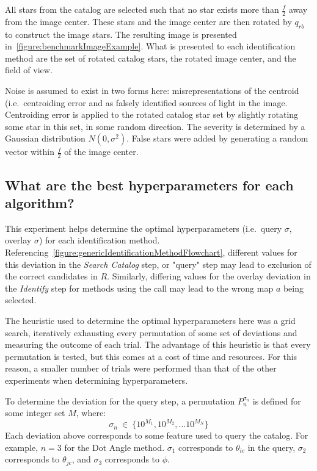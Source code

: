 All stars from the catalog are selected such that no star exists more than $\frac{f}{2}$ away from the image center.
These stars and the image center are then rotated by $q_{rb}$ to construct the image stars.
The resulting image is presented in~\autoref{figure:benchmarkImageExample}.
What is presented to each identification method are the set of rotated catalog stars, the rotated image center, and
the field of view.

Noise is assumed to exist in two forms here: misrepresentations of the centroid (i.e.\ centroiding error and as
falsely identified sources of light in the image.
Centroiding error is applied to the rotated catalog star set by slightly rotating some star in this set, in some
random direction.
The severity is determined by a Gaussian distribution $N(0, \sigma^2)$.
False stars were added by generating a random vector within $\frac{f}{2}$ of the image center.

\subsection{What are the best hyperparameters for each algorithm?}\label{subsec:hyperparameterSelectionMethods}
This experiment helps determine the optimal hyperparameters (i.e.\ query $\sigma$, overlay $\sigma$) for each
identification method.
Referencing~\autoref{figure:genericIdentificationMethodFlowchart}, different values for this deviation in the
\textit{Search Catalog} step, or "query" step may lead to exclusion of the correct candidates in $R$.
Similarly, differing values for the overlay deviation in the \textit{Identify} step for methods using the
 call may lead to the wrong map $a$ being selected.

The heuristic used to determine the optimal hyperparameters here was a grid search, iteratively exhausting every
permutation of some set of deviations and measuring the outcome of each trial.
The advantage of this heuristic is that every permutation is tested, but this comes at a cost of time and resources.
For this reason, a smaller number of trials were performed than that of the other experiments when determining
hyperparameters.

To determine the deviation for the query step, a permutation $P_n^{\sigma_n}$ is defined for some integer set $M$,
where:
\begin{equation}
    \label{eq:gridSearchQuery}
    \sigma_n \ \in \ \{ 10^{M_1}, 10^{M_2}, \ldots 10^{M_N} \}
\end{equation}
Each deviation above corresponds to some feature used to query the catalog.
For example, $n = 3$ for the Dot Angle method.
$\sigma_1$ corresponds to $\theta_{ic}$ in the query, $\sigma_2$ corresponds to $\theta_{jc}$, and $\sigma_3$
corresponds to $\phi$.

